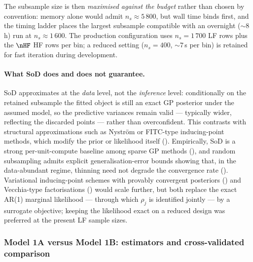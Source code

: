 The subsample size is then \emph{maximised against the budget} rather than
chosen by convention: memory alone would admit $n_s\approx5\,800$, but wall
time binds first, and the timing ladder places the largest subsample
compatible with an overnight (${\sim}8$\,h) run at $n_s\approx1\,600$. The
production configuration uses $n_s=1\,700$ LF rows plus the $\nHF$ HF rows per
bin; a reduced setting ($n_s=400$, ${\sim}7$\,s per bin) is retained for fast
iteration during development.

\paragraph{What SoD does and does not guarantee.}
SoD approximates at the \emph{data} level, not the \emph{inference} level:
conditionally on the retained subsample the fitted object is still an exact GP
posterior under the assumed model, so the predictive variances remain valid
--- typically wider, reflecting the discarded points --- rather than
overconfident. This contrasts with structural approximations such as
Nystr\"om or FITC-type inducing-point methods, which modify the prior or
likelihood itself (). Empirically, SoD is a strong per-unit-compute baseline among
sparse GP methods (), and
random subsampling admits explicit generalisation-error bounds showing that,
in the data-abundant regime, thinning need not degrade the convergence rate
(). Variational inducing-point schemes with provably
convergent posteriors () and
Vecchia-type factorisations () would scale further,
but both replace the exact AR(1) marginal likelihood --- through which
$\rho_j$ is identified jointly --- by a surrogate objective; keeping the
likelihood exact on a reduced design was preferred at the present LF sample
sizes.

\subsubsection{Model 1A versus Model 1B: estimators and cross-validated
comparison}
\label{subsubsec:model1a-vs-1b}

